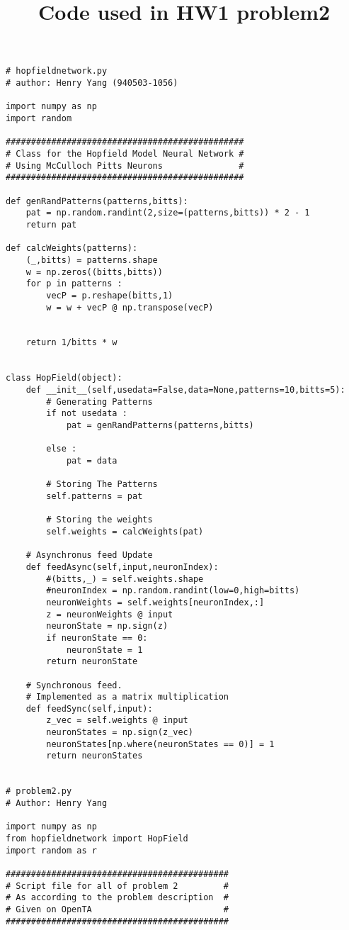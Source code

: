 \documentclass{article}
\title{Code used in HW1 problem2}
\begin{document}
\maketitle

\begin{verbatim}
# hopfieldnetwork.py
# author: Henry Yang (940503-1056)

import numpy as np
import random

###############################################
# Class for the Hopfield Model Neural Network #
# Using McCulloch Pitts Neurons               #
###############################################

def genRandPatterns(patterns,bitts):
    pat = np.random.randint(2,size=(patterns,bitts)) * 2 - 1
    return pat

def calcWeights(patterns):
    (_,bitts) = patterns.shape 
    w = np.zeros((bitts,bitts))
    for p in patterns :
        vecP = p.reshape(bitts,1)
        w = w + vecP @ np.transpose(vecP)


    return 1/bitts * w


class HopField(object):
    def __init__(self,usedata=False,data=None,patterns=10,bitts=5):
        # Generating Patterns
        if not usedata :
            pat = genRandPatterns(patterns,bitts)

        else :
            pat = data

        # Storing The Patterns
        self.patterns = pat

        # Storing the weights
        self.weights = calcWeights(pat)

    # Asynchronus feed Update
    def feedAsync(self,input,neuronIndex):
        #(bitts,_) = self.weights.shape
        #neuronIndex = np.random.randint(low=0,high=bitts)
        neuronWeights = self.weights[neuronIndex,:]
        z = neuronWeights @ input
        neuronState = np.sign(z)
        if neuronState == 0:
            neuronState = 1
        return neuronState
    
    # Synchronous feed.
    # Implemented as a matrix multiplication
    def feedSync(self,input):
        z_vec = self.weights @ input
        neuronStates = np.sign(z_vec)
        neuronStates[np.where(neuronStates == 0)] = 1
        return neuronStates


# problem2.py
# Author: Henry Yang

import numpy as np
from hopfieldnetwork import HopField
import random as r

############################################
# Script file for all of problem 2         #
# As according to the problem description  #
# Given on OpenTA                          #
############################################


\end{verbatim}
\end{document}
